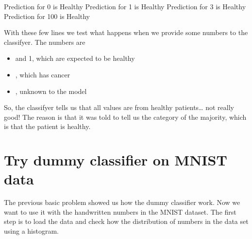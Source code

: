 \documentclass[letterpaper,10pt,english]{sphinxmanual}
\begin{document}
\sphinxAtStartPar
{}

\begin{sphinxVerbatim}[commandchars=\\\{\}]
   \PYG{p}{[}\PYG{p}{]} 
    \PYG{p}{[}\PYG{p}{]}\PYG{p}{[}\PYG{p}{]}
\end{sphinxVerbatim}

\begin{sphinxVerbatim}[commandchars=\\\{\}]
Prediction for 0 is Healthy
Prediction for 1 is Healthy
Prediction for 3 is Healthy
Prediction for 100 is Healthy
\end{sphinxVerbatim}

\sphinxAtStartPar
With these few lines we test what happens when we provide some numbers to the classifyer. The numbers are
\begin{itemize}
\item {} 
 and 1, which are expected to be healthy

\item {} 
 , which has cancer

\item {} 
, unknown to the model

\end{itemize}

\sphinxAtStartPar
So, the classifyer tells us that all values are from healthy patients… not really good! The reason is that it was told to tell us the category of the majority, which is that the patient is healthy.


\section{Try dummy classifier on MNIST data}
\label{\detokenize{03-Datasets:try-dummy-classifier-on-mnist-data}}
\sphinxAtStartPar
The previous basic problem showed us how the dummy classifier work. Now we want to use it with the handwritten numbers in the MNIST dataset. The first step is to load the data and check how the distribution of numbers in the data set using a histogram.
\end{document}
